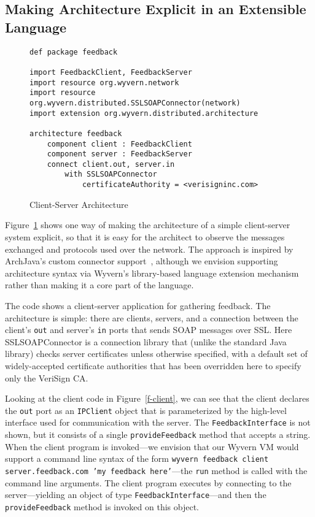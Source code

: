 \documentclass[runningheads]{llncs}
\begin{document}
\begin{sloppypar}
\subsection{Making Architecture Explicit in an Extensible Language}

   
\begin{figure}[t]
\begin{lstlisting}
def package feedback

import FeedbackClient, FeedbackServer
import resource org.wyvern.network
import resource org.wyvern.distributed.SSLSOAPConnector(network)
import extension org.wyvern.distributed.architecture

architecture feedback
    component client : FeedbackClient
    component server : FeedbackServer
    connect client.out, server.in
        with SSLSOAPConnector
            certificateAuthority = <verisigninc.com>
\end{lstlisting}
\caption{Client-Server Architecture}
\label{f-architecture}
\end{figure}

Figure~\ref{f-architecture} shows one way of making the architecture of a simple client-server system explicit, so that it is easy for the architect to observe the messages exchanged and protocols used over the network.  The approach is inspired by ArchJava's custom connector support~\cite{ArchJava-connectors}, although we envision supporting architecture syntax via Wyvern's library-based language extension mechanism~\cite{TSLs-ECOOP14} rather than making it a core part of the language.

The code shows a client-server application for gathering feedback.  The architecture is simple: there are clients, servers, and a connection between the client's \texttt{out} and server's \texttt{in} ports that sends SOAP messages over SSL.  Here SSLSOAPConnector is a connection library that (unlike the standard Java library) checks server certificates unless otherwise specified, with a default set of widely-accepted certificate authorities that has been overridden here to specify only the VeriSign CA.

Looking at the client code in Figure~\ref{f-client}, we can see that the client declares the \texttt{out} port as an \texttt{IPClient} object that is parameterized by the high-level interface used for communication with the server.  The \texttt{FeedbackInterface} is not shown, but it consists of a single \texttt{provideFeedback} method that accepts a string.  When the client program is invoked---we envision that our Wyvern VM would support a command line syntax of the form \texttt{wyvern feedback client server.feedback.com 'my feedback here'}---the \texttt{run} method is called with the command line arguments.  The client program executes by connecting to the server---yielding an object of type \texttt{FeedbackInterface}---and then the \texttt{provideFeedback} method is invoked on this object.


\end{sloppypar}
\end{document}
